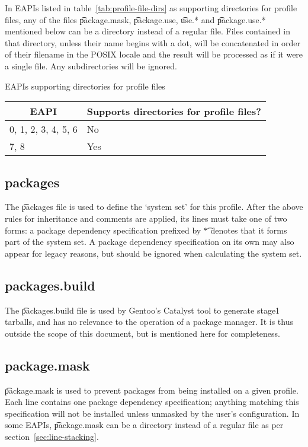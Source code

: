  In EAPIs listed in table~\ref{tab:profile-file-dirs} as supporting
directories for profile files, any of the files \t{package.mask}, \t{package.use}, \t{use.*} and
\t{package.use.*} mentioned below can be a directory instead of a regular file. Files contained
in that directory, unless their name begins with a dot, will be concatenated in order of their
filename in the POSIX locale and the result will be processed as if it were a single file.
Any subdirectories will be ignored.

\begin{centertable}{EAPIs supporting directories for profile files}
    \label{tab:profile-file-dirs}
    \begin{tabular}{ll}
      \toprule
      \multicolumn{1}{c}{\textbf{EAPI}} &
      \multicolumn{1}{c}{\textbf{Supports directories for profile files?}} \\
      \midrule
      0, 1, 2, 3, 4, 5, 6 & No  \\
      7, 8                & Yes \\
      \bottomrule
    \end{tabular}
\end{centertable}

\subsection{packages}
The \t{packages} file is used to define the `system set' for this profile.
After the above rules for inheritance and comments are applied, its lines must take one of two
forms: a package dependency specification prefixed by \t{*} denotes that it forms part of the
system set. A package dependency specification on its own may also appear for legacy reasons, but
should be ignored when calculating the system set.

\subsection{packages.build}
The \t{packages.build} file is used by Gentoo's Catalyst tool to generate stage1 tarballs, and has
no relevance to the operation of a package manager. It is thus outside the scope of this document,
but is mentioned here for completeness.

\subsection{package.mask}
\t{package.mask} is used to prevent packages from being installed on a given profile. Each line
contains one package dependency specification; anything matching this specification will not be
installed unless unmasked by the user's configuration. In some EAPIs, \t{package.mask} can be a
directory instead of a regular file as per section~\ref{sec:line-stacking}.

